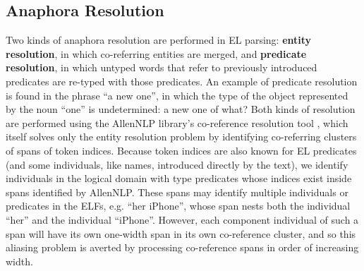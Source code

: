 \subsection{Anaphora Resolution}
\label{sec:anaphora_res}

Two kinds of anaphora resolution are performed in EL parsing: \textbf{entity resolution}, in which co-referring entities are merged, and \textbf{predicate resolution}, in which untyped words that refer to previously introduced predicates are re-typed with those predicates. An example of predicate resolution is found in the phrase ``a new one'', in which the type of the object represented by the noun ``one'' is undetermined: a new one of what? Both kinds of resolution are performed using the AllenNLP library's co-reference resolution tool \citep{Gardner2017AllenNLP}, which itself solves only the entity resolution problem by identifying co-referring clusters of spans of token indices. Because token indices are also known for EL predicates (and some individuals, like names, introduced directly by the text), we identify individuals in the logical domain with type predicates whose indices exist inside spans identified by AllenNLP. These spans may identify multiple individuals or predicates in the ELFs, e.g. ``her iPhone'', whose span nests both the individual ``her'' and the individual ``iPhone''. However, each component individual of such a span will have its own one-width span in its own co-reference cluster, and so this aliasing problem is averted by processing co-reference spans in order of increasing width.

